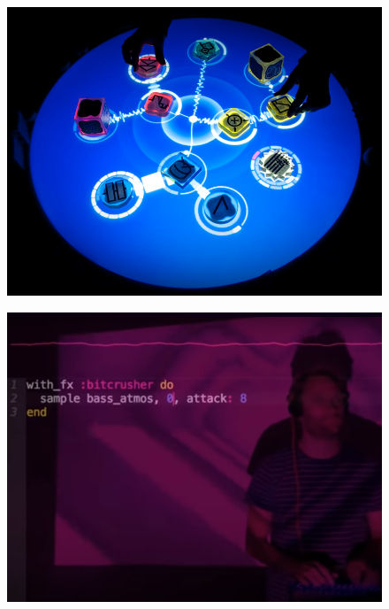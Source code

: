 \documentclass[thesis=B, czech]{FITthesis}[2019/03/06]
\begin{document}
\begin{figure}[h]
\centering
\begin{minipage}{.5\textwidth}
  \centering
  \includegraphics[width=0.9\linewidth]{images/reactable.jpg}
  \label{fig:reactable}
\end{minipage}%
\begin{minipage}{.5\textwidth}
  \centering
  \includegraphics[width=0.9\linewidth]{images/sonicpi.png}
  \label{fig:collider}
\end{minipage}
\end{figure}




\end{document}
